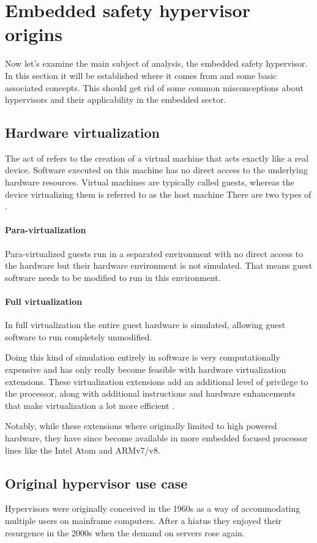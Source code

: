 \section{Embedded safety hypervisor origins}
Now let's examine the main subject of analysis, the embedded safety hypervisor. In this section it will be established where it comes from and some basic associated concepts. This should get rid of some common misconceptions about hypervisors and their applicability in the embedded sector.
\subsection{Hardware virtualization} \label{hw-virt}
The act of  refers to the creation of a virtual machine  that acts exactly like a real device. Software executed on this machine has no direct access to the underlying hardware resources. Virtual machines are typically called guests, whereas the device virtualizing them is referred to as the host machine
There are two types of .
\paragraph{Para-virtualization}
Para-virtualized guests run in a separated environment with no direct access to the hardware but their hardware environment is not simulated. That means guest software needs to be modified to run in this environment.
\paragraph{Full virtualization}
In full virtualization the entire guest hardware is simulated, allowing guest software to run completely unmodified.

Doing this kind of simulation entirely in software is very computationally expensive and has only really become feasible with hardware virtualization extensions. These virtualization extensions add an additional level of privilege to the processor, along with additional instructions and hardware enhancements that make virtualization a lot more efficient \cite{ARM.v8.2018}.

Notably, while these extensions where originally limited to high powered hardware, they have since become available in more embedded focused processor lines like the Intel Atom and ARMv7/v8.
\subsection{Original hypervisor use case}
Hypervisors were originally conceived in the 1960s as a way of accommodating multiple users on mainframe computers. After a hiatus they enjoyed their resurgence in the 2000s when the demand on servers rose again. 

